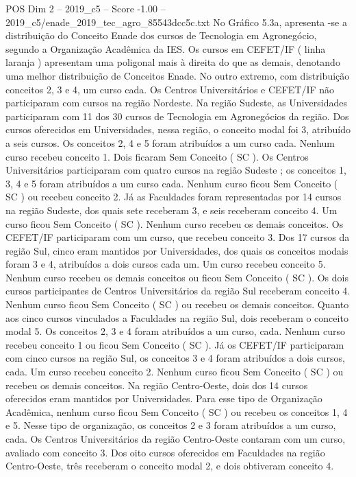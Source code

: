 \begin{textsample}{POS Dim 2 – 2019\_c5 – Score -1.00 – 2019\_c5/enade\_2019\_tec\_agro\_85543dcc5c.txt}
No Gráfico 5.3a, apresenta -se a distribuição do Conceito Enade dos cursos de Tecnologia em Agronegócio, segundo a Organização Acadêmica da IES.
Os cursos em CEFET/IF ( linha laranja ) apresentam uma poligonal mais à direita do que as demais, denotando uma melhor distribuição de Conceitos Enade.
No outro extremo, com distribuição conceitos 2, 3 e 4, um curso cada.
Os Centros Universitários e CEFET/IF não participaram com cursos na região Nordeste.
Na região Sudeste, as Universidades participaram com 11 dos 30 cursos de Tecnologia em Agronegócios da região.
Dos cursos oferecidos em Universidades, nessa região, o conceito modal foi 3, atribuído a seis cursos.
Os conceitos 2, 4 e 5 foram atribuídos a um curso cada.
Nenhum curso recebeu conceito 1.
Dois ficaram Sem Conceito ( SC ).
Os Centros Universitários participaram com quatro cursos na região Sudeste ; os conceitos 1, 3, 4 e 5 foram atribuídos a um curso cada.
Nenhum curso ficou Sem Conceito ( SC ) ou recebeu conceito 2.
Já as Faculdades foram representadas por 14 cursos na região Sudeste, dos quais sete receberam 3, e seis receberam conceito 4.
Um curso ficou Sem Conceito ( SC ).
Nenhum curso recebeu os demais conceitos.
Os CEFET/IF participaram com um curso, que recebeu conceito 3.
Dos 17 cursos da região Sul, cinco eram mantidos por Universidades, dos quais os conceitos modais foram 3 e 4, atribuídos a dois cursos cada um.
Um curso recebeu conceito 5.
Nenhum curso recebeu os demais conceitos ou ficou Sem Conceito ( SC ).
Os dois cursos participantes de Centros Universitários da região Sul receberam conceito 4.
Nenhum curso ficou Sem Conceito ( SC ) ou recebeu os demais conceitos.
Quanto aos cinco cursos vinculados a Faculdades na região Sul, dois receberam o conceito modal 5.
Os conceitos 2, 3 e 4 foram atribuídos a um curso, cada.
Nenhum curso recebeu conceito 1 ou ficou Sem Conceito ( SC ).
Já os CEFET/IF participaram com cinco cursos na região Sul, os conceitos 3 e 4 foram atribuídos a dois cursos, cada.
Um curso recebeu conceito 2.
Nenhum curso ficou Sem Conceito ( SC ) ou recebeu os demais conceitos.
Na região Centro-Oeste, dois dos 14 cursos oferecidos eram mantidos por Universidades.
Para esse tipo de Organização Acadêmica, nenhum curso ficou Sem Conceito ( SC ) ou recebeu os conceitos 1, 4 e 5.
Nesse tipo de organização, os conceitos 2 e 3 foram atribuídos a um curso, cada.
Os Centros Universitários da região Centro-Oeste contaram com um curso, avaliado com conceito 3.
Dos oito cursos oferecidos em Faculdades na região Centro-Oeste, três receberam o conceito modal 2, e dois obtiveram conceito 4.

\end{textsample}
